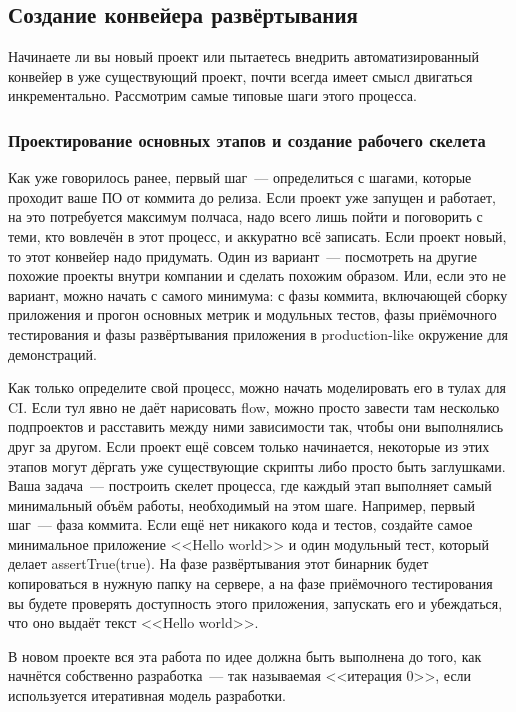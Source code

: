 \documentclass{../../text-style}
\begin{document}
\subsection{Создание конвейера развёртывания}

Начинаете ли вы новый проект или пытаетесь внедрить автоматизированный конвейер в уже существующий проект, почти всегда имеет смысл двигаться инкрементально. Рассмотрим самые типовые шаги этого процесса.

\subsubsection{Проектирование основных этапов и создание рабочего скелета}

Как уже говорилось ранее, первый шаг~--- определиться с шагами, которые проходит ваше ПО от коммита до релиза. Если проект уже запущен и работает, на это потребуется максимум полчаса, надо всего лишь пойти и поговорить с теми, кто вовлечён в этот процесс, и аккуратно всё записать. Если проект новый, то этот конвейер надо придумать. Один из вариант~--- посмотреть на другие похожие проекты внутри компании и сделать похожим образом. Или, если это не вариант, можно начать с самого минимума: с фазы коммита, включающей сборку приложения и прогон основных метрик и модульных тестов, фазы приёмочного тестирования и фазы развёртывания приложения в production-like окружение для демонстраций.

Как только определите свой процесс, можно начать моделировать его в тулах для CI. Если тул явно не даёт нарисовать flow, можно просто завести там несколько подпроектов и расставить между ними зависимости так, чтобы они выполнялись друг за другом. Если проект ещё совсем только начинается, некоторые из этих этапов могут дёргать уже существующие скрипты либо просто быть заглушками. Ваша задача~--- построить скелет процесса, где каждый этап выполняет самый минимальный объём работы, необходимый на этом шаге. Например, первый шаг~--- фаза коммита. Если ещё нет никакого кода и тестов, создайте самое минимальное приложение <<Hello world>> и один модульный тест, который делает assertTrue(true). На фазе развёртывания этот бинарник будет копироваться в нужную папку на сервере, а на фазе приёмочного тестирования вы будете проверять доступность этого приложения, запускать его и убеждаться, что оно выдаёт текст <<Hello world>>.

В новом проекте вся эта работа по идее должна быть выполнена до того, как начнётся собственно разработка~--- так называемая <<итерация 0>>, если используется итеративная модель разработки.
\end{document}
